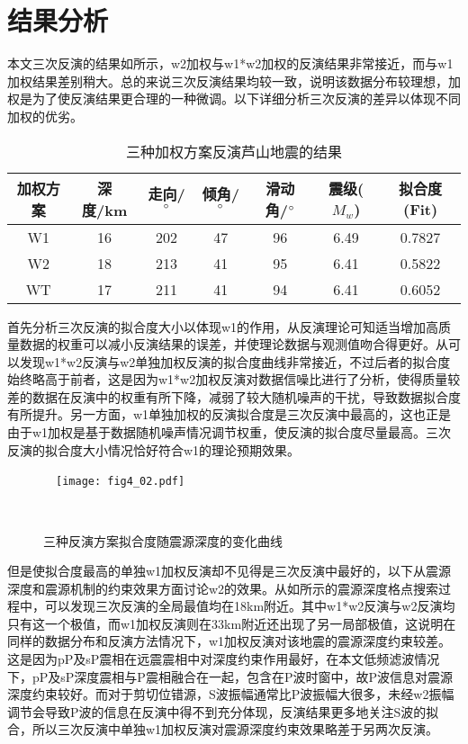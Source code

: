 \section{结果分析}

本文三次反演的结果如所示，w2加权与w1*w2加权的反演结果非常接近，而与w1加权结果差别稍大。总的来说三次反演结果均较一致，说明该数据分布较理想，加权是为了使反演结果更合理的一种微调。以下详细分析三次反演的差异以体现不同加权的优劣。
\begin{table}[ht]
\centering
\caption{三种加权方案反演芦山地震的结果}
\label{tab4_01}
    \begin{tabular}{c c c c c c c}
    \hline
    加权方案 & 深度/km  & 走向/$^\circ$ & 倾角/$^\circ$ & 滑动角/$^\circ$ & 震级($M_w$) & 拟合度(Fit) \\
    \hline
    W1		& 16  & 202 & 47 & 96 & 6.49 & 0.7827 \\
    W2		& 18  & 213 & 41 & 95 & 6.41 & 0.5822 \\
    WT		& 17  & 211 & 41 & 94 & 6.41 & 0.6052 \\
    \hline
    \end{tabular}
\end{table}

首先分析三次反演的拟合度大小以体现w1的作用，从反演理论可知适当增加高质量数据的权重可以减小反演结果的误差，并使理论数据与观测值吻合得更好。从可以发现w1*w2反演与w2单独加权反演的拟合度曲线非常接近，不过后者的拟合度始终略高于前者，这是因为w1*w2加权反演对数据信噪比进行了分析，使得质量较差的数据在反演中的权重有所下降，减弱了较大随机噪声的干扰，导致数据拟合度有所提升。另一方面，w1单独加权的反演拟合度是三次反演中最高的，这也正是由于w1加权是基于数据随机噪声情况调节权重，使反演的拟合度尽量最高。三次反演的拟合度大小情况恰好符合w1的理论预期效果。
\begin{figure}
\centering
  \texttt{[image: fig4\_02.pdf]}
  \caption{三种反演方案拟合度随震源深度的变化曲线}
  \label{fig4_02}
\end{figure}

但是使拟合度最高的单独w1加权反演却不见得是三次反演中最好的，以下从震源深度和震源机制的约束效果方面讨论w2的效果。从如所示的震源深度格点搜索过程中，可以发现三次反演的全局最值均在18km附近。其中w1*w2反演与w2反演均只有这一个极值，而w1加权反演则在33km附近还出现了另一局部极值，这说明在同样的数据分布和反演方法情况下，w1加权反演对该地震的震源深度约束较差。这是因为pP及sP震相在远震震相中对深度约束作用最好，在本文低频滤波情况下，pP及sP深度震相与P震相融合在一起，包含在P波时窗中，故P波信息对震源深度约束较好。而对于剪切位错源，S波振幅通常比P波振幅大很多，未经w2振幅调节会导致P波的信息在反演中得不到充分体现，反演结果更多地关注S波的拟合，所以三次反演中单独w1加权反演对震源深度约束效果略差于另两次反演。

